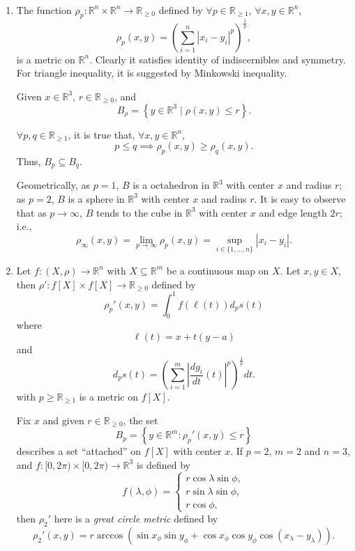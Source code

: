 \begin{example} \ 
	\begin{enumerate}
		\item The function $\rho_p: \mathbb R^n \times \mathbb R^n \to \mathbb R_{\ge 0}$ defined by $\forall p \in \mathbb R_{\ge 1}$, $\forall x,y \in \mathbb R^n$,
			$$
			\rho_p (x,y) = \left( \sum_{i = 1}^n |x_i - y_i|^p \right)^\frac{1}{p},
			$$
			is a metric on $\mathbb R^n$. Clearly it satisfies identity of indiscernibles and symmetry. For triangle inequality, it is suggested by Minkowski inequality.
			
			Given $x \in \mathbb R^3$, $r \in \mathbb R_{\ge 0}$, and
			$$
			B_\rho = \left\{ y \in \mathbb R^3 \;|\; \rho (x,y) \le r \right\}.
			$$
			
			
			$\forall p, q \in \mathbb R_{\ge 1}$, it is true that, $\forall x,y \in \mathbb R^n$,
			$$
			p \le q \implies \rho_p(x,y) \ge \rho_{q}(x,y).
			$$
			Thus, $B_p \subseteq B_q$.
			
			Geometrically, as $p = 1$, $B$ is a octahedron in $\mathbb R^3$ with center $x$ and radius $r$; as $p = 2$, $B$ is a sphere in $\mathbb R^3$ with center $x$ and radius $r$. It is easy to observe that as $p \to \infty$, $B$ tends to the cube in $\mathbb R^3$ with center $x$ and edge length $2r$; i.e.,
			$$
			\rho_\infty(x,y) = \lim_{p \to \infty} \rho_p (x,y) = \sup_{i \in \{1, \ldots, n\}} |x_i - y_i|.
			$$
		
		
		\item Let $f: (X, \rho) \to \mathbb R^n$ with $X \subseteq \mathbb R^m$ be a continuous map on $X$. Let $x, y \in X$, then $\rho': f[X] \times f[X] \to \mathbb R_{\ge 0}$ defined by
			$$
			\rho_p'(x,y) = \int_0^1 f(\ell(t))d_ps(t)
			$$
			where
			$$
			\ell (t) = x + t(y - a)
			$$
			and
			$$
			d_p s(t) = \left( \sum_{i = 1}^m \left|\frac{dg_i}{dt}(t)\right|^p\right)^\frac{1}{p} dt.
			$$
			with $p \ge \mathbb R_{\ge 1}$ is a metric on $f[X]$.
			
			Fix $x$ and given $r \in \mathbb R_{\ge 0}$, the set
			$$
			B_p = \left\{ y \in \mathbb R^m : \rho_p'(x,y) \le r \right\}
			$$
			describes a set ``attached'' on $f[X]$ with center $x$.			
			If $p = 2$, $m = 2$ and $n = 3$, and $f: [0, 2 \pi) \times [0, 2 \pi) \to \mathbb R^3$ is defined by
			$$
			f(\lambda, \phi) = \begin{cases}
				r \cos \lambda \sin \phi, \\
				r \sin \lambda \sin \phi, \\
				r \cos \phi,
			\end{cases}
			$$
			then $\rho_2'$ here is a \textit{great circle metric} defined by
			$$
			\rho_2' (x,y) = r\arccos(\sin x_\phi \sin y_\phi + \cos x_\phi \cos y_\phi \cos(x_\lambda - y_\lambda)).
			$$
		

\end{enumerate}
\end{example}
